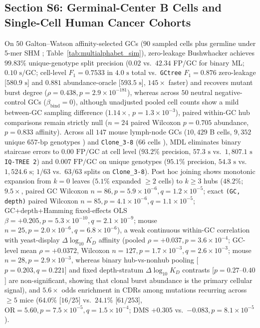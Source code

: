 \documentclass[12pt]{article}
\begin{document}
\subsection*{Section S6: Germinal-Center B Cells and Single-Cell Human Cancer Cohorts}

On $50$ Galton--Watson affinity-selected GCs ($90$ sampled cells plus germline under 5-mer SHM \cite{dewitt2018gctree}; Table~\ref{tab:multialphabet_sim}), zero-leakage Bushwhacker achieves $99.83\%$ unique-genotype split precision ($0.02$ vs.\ $42.34$ FP/GC for binary ML; $0.10\text{ s/GC}$; cell-level $F_1 = 0.7533$ in $4.0\text{ s}$ total vs.\ \texttt{GCtree} $F_1 = 0.876$ zero-leakage [$580.9\text{ s}$] and $0.881$ abundance-oracle [$593.5\text{ s}$], $145\times$ faster) and recovers mutant burst degree ($\rho = 0.438, p = 2.9\times 10^{-181}$), whereas across $50$ neutral negative-control GCs ($\beta_{\text{bind}} = 0$), although unadjusted pooled cell counts show a mild between-GC sampling difference ($1.14\times$, $p = 1.3\times 10^{-3}$), paired within-GC hub comparisons remain strictly null ($n = 24$ paired Wilcoxon $p = 0.705$ abundance, $p = 0.833$ affinity). Across all $147$ mouse lymph-node GCs ($10,429$ B cells, $9,352$ unique $657\text{-bp}$ genotypes \cite{dewitt2026gcreplay}) and \texttt{Clone\_3-8} ($66$ cells \cite{tas2016visualizing}), MDL eliminates binary staircase errors to $0.00\text{ FP/GC}$ at cell level ($93.2\%$ precision, $57.3\text{ s}$ vs.\ $1,807.1\text{ s}$ \texttt{IQ-TREE 2}) and $0.007\text{ FP/GC}$ on unique genotypes ($95.1\%$ precision, $54.3\text{ s}$ vs.\ $1,524.6\text{ s}$; $1/63$ vs.\ $63/63$ splits on \texttt{Clone\_3-8}). Post hoc joining shows monotonic expansion from $k=0$ leaves ($5.1\%$ expanded $\ge 2$ cells) to $k \ge 3$ hubs ($48.2\%$; $9.5\times$, paired GC Wilcoxon $n=86, p = 5.9\times 10^{-6}, q = 1.2\times 10^{-5}$; exact \texttt{(GC, depth)} paired Wilcoxon $n=85, p = 4.1\times 10^{-6}, q = 1.1\times 10^{-5}$; GC+depth+Hamming fixed-effects OLS $\beta = +0.205, p = 5.3\times 10^{-10}, q = 2.1\times 10^{-9}$; mouse $n=25, p = 2.0\times 10^{-6}, q = 6.8\times 10^{-6}$), a weak continuous within-GC correlation with yeast-display $\Delta\log_{10} K_D$ affinity (pooled $\rho = +0.037, p = 3.6\times 10^{-4}$; GC-level mean $\rho = +0.0372$, Wilcoxon $n=127, p = 1.7\times 10^{-3}, q = 2.6\times 10^{-3}$; mouse $n=28, p = 2.9\times 10^{-3}$, whereas binary hub-vs-nonhub pooling [$p = 0.203, q = 0.221$] and fixed depth-stratum $\Delta\log_{10} K_D$ contrasts [$p = 0.27\text{--}0.40$] are non-significant, showing that clonal burst abundance is the primary cellular signal), and $5.6\times$ odds enrichment in CDRs among mutations recurring across $\ge 5$ mice ($64.0\%$ [$16/25$] vs.\ $24.1\%$ [$61/253$], $\text{OR} = 5.60, p = 7.5\times 10^{-5}, q = 1.5\times 10^{-4}$; DMS $+0.305$ vs.\ $-0.083, p = 8.1\times 10^{-5}$).
\end{document}
